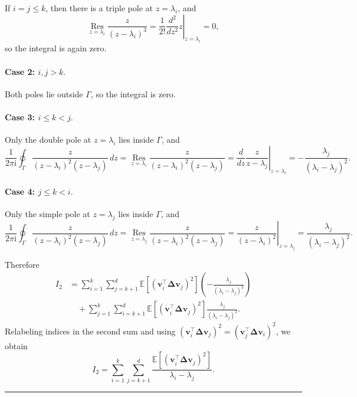 \documentclass{article}
\newcommand{\Ex}[1]{\mbox{}\mathbb{E}\left[#1\right]}
\newcommand{\ts}{\top}
\newcommand{\vb}{\mathbf{v}}
\newcommand{\BlackBox}{\rule{1.5ex}{1.5ex}}  %
\newenvironment{proof}{\par\noindent{\bf Proof\ }}{\hfill\BlackBox\par\medskip}
\newcommand{\Deltab}{\boldsymbol{\Delta}}
\begin{document}
\begin{proof}
If $i=j\le k$, then there is a triple pole at
$z=\lambda_i$, and
\begin{equation}
    \operatorname*{Res}_{z=\lambda_i}\frac{z}{(z-\lambda_i)^3}
    =
    \frac{1}{2!}\left.\frac{d^2}{dz^2} z\right|_{z=\lambda_i}
    =
    0,
\end{equation}
so the integral is again zero.

\paragraph{Case 2: $i,j>k.$}

Both poles lie outside $\Gamma$, so the integral is zero.

\paragraph{Case 3: $i\le k<j.$}

Only the double pole at $z=\lambda_i$ lies inside
$\Gamma$, and
\begin{equation}
    \frac{1}{2\pi \mathrm{i}}\oint_\Gamma \frac{z}{(z-\lambda_i)^2(z-\lambda_j)}\,dz
    =
    \operatorname*{Res}_{z=\lambda_i}\frac{z}{(z-\lambda_i)^2(z-\lambda_j)}
    =
    \left.\frac{d}{dz}\frac{z}{z-\lambda_j}\right|_{z=\lambda_i}
    =
    -\frac{\lambda_j}{(\lambda_i-\lambda_j)^2}.
\end{equation}

\paragraph{Case 4: $j\le k<i.$}
Only the simple pole at $z=\lambda_j$ lies inside
$\Gamma$, and
\begin{equation}
    \frac{1}{2\pi \mathrm{i}}\oint_\Gamma \frac{z}{(z-\lambda_i)^2(z-\lambda_j)}\,dz
    =
    \operatorname*{Res}_{z=\lambda_j}\frac{z}{(z-\lambda_i)^2(z-\lambda_j)}
    =
    \left.\frac{z}{(z-\lambda_i)^2}\right|_{z=\lambda_j}
    =
    \frac{\lambda_j}{(\lambda_i-\lambda_j)^2}.
\end{equation}

Therefore
\begin{align}
    I_2 &=
    \sum_{i=1}^k \sum_{j=k+1}^d
    \Ex{(\vb_i^\ts \Deltab \vb_j)^2}
    \left(-\frac{\lambda_j}{(\lambda_i-\lambda_j)^2}\right) \\
    &\quad+
    \sum_{j=1}^k \sum_{i=k+1}^d
    \Ex{(\vb_i^\ts \Deltab \vb_j)^2}
    \frac{\lambda_j}{(\lambda_i-\lambda_j)^2}.
\end{align}
Relabeling indices in the second sum and using
$(\vb_i^\ts \Deltab \vb_j)^2=(\vb_j^\ts \Deltab \vb_i)^2$, we obtain
\begin{equation}\label{eq:I2-clean}
    I_2 = \sum_{i=1}^k \sum_{j=k+1}^d
    \frac{\Ex{(\vb_i^\ts \Deltab \vb_j)^2}}{\lambda_i-\lambda_j}.
\end{equation}



\end{proof}
\end{document}
